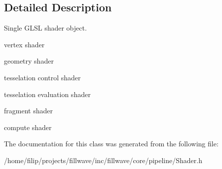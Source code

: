 \subsection{Detailed Description}
Single G\+L\+SL shader object. 


\begin{DoxyItemize}
\item vertex shader
\item geometry shader
\item tesselation control shader
\item tesselation evaluation shader
\item fragment shader
\item compute shader 
\end{DoxyItemize}

The documentation for this class was generated from the following file\+:\begin{DoxyCompactItemize}
\item 
/home/filip/projects/fillwave/inc/fillwave/core/pipeline/Shader.\+h\end{DoxyCompactItemize}
